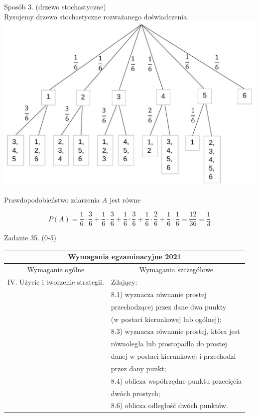 \documentclass[10pt]{article}
\begin{document}
Sposób 3. (drzewo stochastyczne)\\
Rysujemy drzewo stochastyczne rozważanego doświadczenia.\\
\includegraphics[max width=\textwidth, center]{2025_02_07_6828143ce1e2fe8e0865g-25}

Prawdopodobieństwo zdarzenia $A$ jest równe

$$
P(A)=\frac{1}{6} \cdot \frac{3}{6}+\frac{1}{6} \cdot \frac{3}{6}+\frac{1}{6} \cdot \frac{3}{6}+\frac{1}{6} \cdot \frac{2}{6}+\frac{1}{6} \cdot \frac{1}{6}=\frac{12}{36}=\frac{1}{3}
$$

Zadanie 35. (0-5)

\begin{center}
\begin{tabular}{|l|l|}
\hline
\multicolumn{2}{|c|}{Wymagania egzaminacyjne 2021} \\
\hline
\multicolumn{1}{|c|}{Wymaganie ogólne} & \multicolumn{1}{c|}{Wymagania szczegółowe} \\
\hline
IV. Użycie i tworzenie strategii. & Zdający: \\
 & 8.1) wyznacza równanie prostej \\
 & przechodzącej przez dane dwa punkty \\
 & (w postaci kierunkowej lub ogólnej); \\
 & 8.3) wyznacza równanie prostej, która jest \\
 & równoległa lub prostopadła do prostej \\
 & danej w postaci kierunkowej i przechodzi \\
 & przez dany punkt; \\
 & 8.4) oblicza współrzędne punktu przecięcia \\
 & dwóch prostych; \\
 & 8.6) oblicza odległość dwóch punktów. \\
\hline
\end{tabular}
\end{center}
\end{document}
